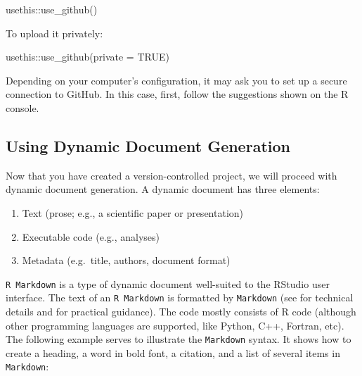 \documentclass[psych,tutorial,submit,moreauthors,pdftex]{mdpi}
\providecommand{\tightlist}{%
  \setlength{\itemsep}{0pt}\setlength{\parskip}{4pt}}
\newenvironment{Shaded}{\begin{snugshade}}{\end{snugshade}}
\newcommand{\AttributeTok}[1]{\textcolor[rgb]{0.77,0.63,0.00}{#1}}
\newcommand{\ConstantTok}[1]{\textcolor[rgb]{0.00,0.00,0.00}{#1}}
\newcommand{\FunctionTok}[1]{\textcolor[rgb]{0.00,0.00,0.00}{#1}}
\newcommand{\NormalTok}[1]{#1}
\newcommand{\SpecialCharTok}[1]{\textcolor[rgb]{0.00,0.00,0.00}{#1}}
\begin{document}
\begin{Shaded}
\begin{Highlighting}[]
\NormalTok{usethis}\SpecialCharTok{::}\FunctionTok{use\_github}\NormalTok{()}
\end{Highlighting}
\end{Shaded}

To upload it privately:

\begin{Shaded}
\begin{Highlighting}[]
\NormalTok{usethis}\SpecialCharTok{::}\FunctionTok{use\_github}\NormalTok{(}\AttributeTok{private =} \ConstantTok{TRUE}\NormalTok{)}
\end{Highlighting}
\end{Shaded}

Depending on your computer's configuration, it may ask you to set up a
secure connection to GitHub. In this case, first, follow the suggestions
shown on the R console.

\hypertarget{using-dynamic-document-generation}{%
\subsection{Using Dynamic Document
Generation}\label{using-dynamic-document-generation}}

Now that you have created a version-controlled project, we will proceed
with dynamic document generation. A dynamic document has three elements:

\begin{enumerate}
\def\labelenumi{\arabic{enumi}.}
\tightlist
\item
  Text (prose; e.g., a scientific paper or presentation)
\item
  Executable code (e.g., analyses)
\item
  Metadata (e.g.~title, authors, document format)
\end{enumerate}

\texttt{R\ Markdown} is a type of dynamic document well-suited to the
RStudio user interface. The text of an \texttt{R\ Markdown} is formatted
by \texttt{Markdown} (see \citep{xieMarkdownDefinitiveGuide2019} for
technical details and \citep{xieMarkdownCookbook2020} for practical
guidance). The code mostly consists of R code (although other
programming languages are supported, like Python, C++, Fortran, etc).
The following example serves to illustrate the \texttt{Markdown} syntax.
It shows how to create a heading, a word in bold font, a citation, and a
list of several items in \texttt{Markdown}:
\end{document}
